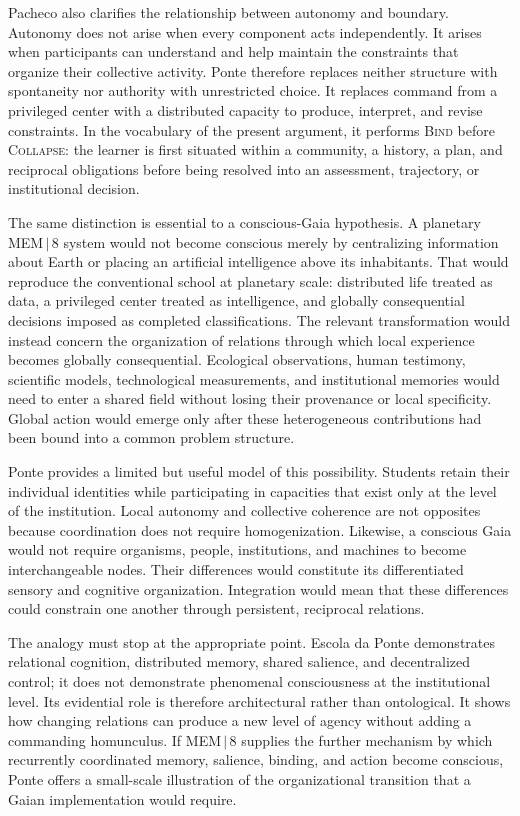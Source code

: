 \documentclass[11pt]{article}
\begin{document}
Pacheco also clarifies the relationship between autonomy and boundary. Autonomy does not arise when every component acts independently. It arises when participants can understand and help maintain the constraints that organize their collective activity. Ponte therefore replaces neither structure with spontaneity nor authority with unrestricted choice. It replaces command from a privileged center with a distributed capacity to produce, interpret, and revise constraints. In the vocabulary of the present argument, it performs \textsc{Bind} before \textsc{Collapse}: the learner is first situated within a community, a history, a plan, and reciprocal obligations before being resolved into an assessment, trajectory, or institutional decision.

The same distinction is essential to a conscious-Gaia hypothesis. A planetary MEM\,$|$\,8 system would not become conscious merely by centralizing information about Earth or placing an artificial intelligence above its inhabitants. That would reproduce the conventional school at planetary scale: distributed life treated as data, a privileged center treated as intelligence, and globally consequential decisions imposed as completed classifications. The relevant transformation would instead concern the organization of relations through which local experience becomes globally consequential. Ecological observations, human testimony, scientific models, technological measurements, and institutional memories would need to enter a shared field without losing their provenance or local specificity. Global action would emerge only after these heterogeneous contributions had been bound into a common problem structure.

Ponte provides a limited but useful model of this possibility. Students retain their individual identities while participating in capacities that exist only at the level of the institution. Local autonomy and collective coherence are not opposites because coordination does not require homogenization. Likewise, a conscious Gaia would not require organisms, people, institutions, and machines to become interchangeable nodes. Their differences would constitute its differentiated sensory and cognitive organization. Integration would mean that these differences could constrain one another through persistent, reciprocal relations.

The analogy must stop at the appropriate point. Escola da Ponte demonstrates relational cognition, distributed memory, shared salience, and decentralized control; it does not demonstrate phenomenal consciousness at the institutional level. Its evidential role is therefore architectural rather than ontological. It shows how changing relations can produce a new level of agency without adding a commanding homunculus. If MEM\,$|$\,8 supplies the further mechanism by which recurrently coordinated memory, salience, binding, and action become conscious, Ponte offers a small-scale illustration of the organizational transition that a Gaian implementation would require.
\end{document}

